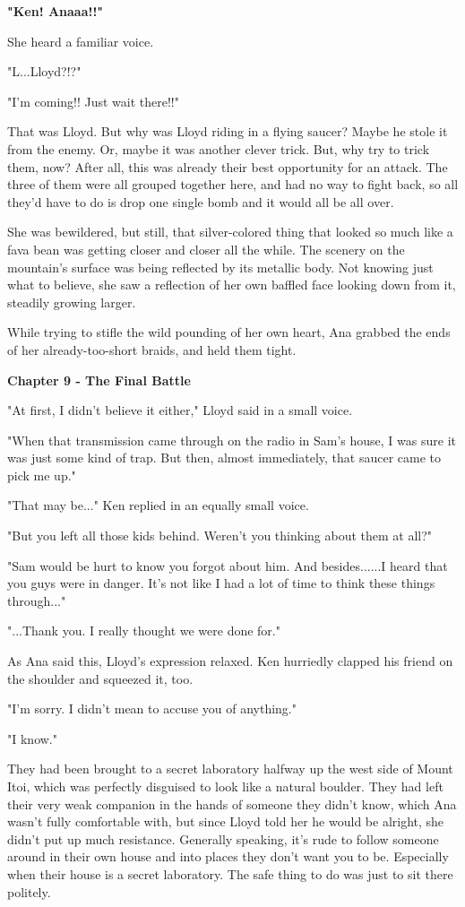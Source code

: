 \documentclass[
]{article}
\begin{document}
\textbf{"Ken! Anaaa!!"}

She heard a familiar voice.

"L...Lloyd?!?"

"I'm coming!! Just wait there!!"

That was Lloyd. But why was Lloyd riding in a flying saucer? Maybe he
stole it from the enemy. Or, maybe it was another clever trick. But, why
try to trick them, now? After all, this was already their best
opportunity for an attack. The three of them were all grouped together
here, and had no way to fight back, so all they'd have to do is drop one
single bomb and it would all be all over.

She was bewildered, but still, that silver-colored thing that looked so
much like a fava bean was getting closer and closer all the while. The
scenery on the mountain's surface was being reflected by its metallic
body. Not knowing just what to believe, she saw a reflection of her own
baffled face looking down from it, steadily growing larger.

While trying to stifle the wild pounding of her own heart, Ana grabbed
the ends of her already-too-short braids, and held them tight.

\textbf{Chapter 9 - The Final Battle}

"At first, I didn't believe it either," Lloyd said in a small voice.

"When that transmission came through on the radio in Sam's house, I was
sure it was just some kind of trap. But then, almost immediately, that
saucer came to pick me up."

"That may be..." Ken replied in an equally small voice.

"But you left all those kids behind. Weren't you thinking about them at
all?"

"Sam would be hurt to know you forgot about him. And besides......I
heard that you guys were in danger. It's not like I had a lot of time to
think these things through..."

"...Thank you. I really thought we were done for."

As Ana said this, Lloyd's expression relaxed. Ken hurriedly clapped his
friend on the shoulder and squeezed it, too.

"I'm sorry. I didn't mean to accuse you of anything."

"I know."

They had been brought to a secret laboratory halfway up the west side of
Mount Itoi, which was perfectly disguised to look like a natural
boulder. They had left their very weak companion in the hands of someone
they didn't know, which Ana wasn't fully comfortable with, but since
Lloyd told her he would be alright, she didn't put up much resistance.
Generally speaking, it's rude to follow someone around in their own
house and into places they don't want you to be. Especially when their
house is a secret laboratory. The safe thing to do was just to sit there
politely.
\end{document}
